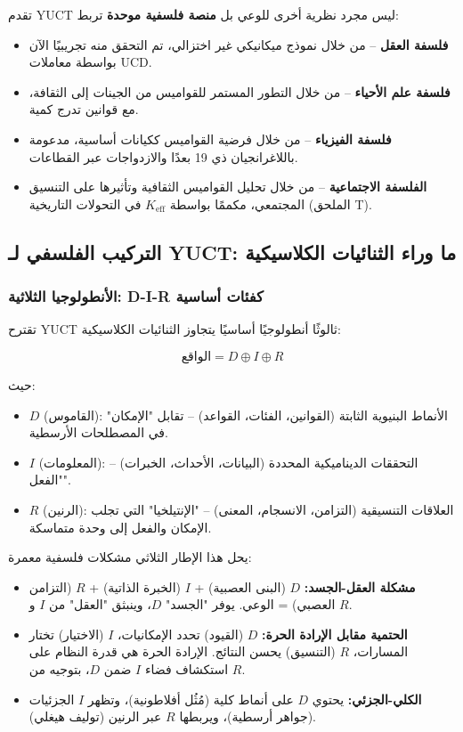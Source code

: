 \documentclass[12pt,a4paper]{article}
\newcommand{\eff}{\mathrm{eff}}
\newcommand{\Ke}{K_{\eff}}
\begin{document}
	تقدم YUCT ليس مجرد نظرية أخرى للوعي بل \textbf{منصة فلسفية موحدة} تربط:
	\begin{itemize}
		\item \textbf{فلسفة العقل} – من خلال نموذج ميكانيكي غير اختزالي، تم التحقق منه تجريبيًا الآن بواسطة معاملات UCD.
		\item \textbf{فلسفة علم الأحياء} – من خلال التطور المستمر للقواميس من الجينات إلى الثقافة، مع قوانين تدرج كمية.
		\item \textbf{فلسفة الفيزياء} – من خلال فرضية القواميس ككيانات أساسية، مدعومة باللاغرانجيان ذي 19 بعدًا والازدواجات عبر القطاعات.
		\item \textbf{الفلسفة الاجتماعية} – من خلال تحليل القواميس الثقافية وتأثيرها على التنسيق المجتمعي، مكممًا بواسطة \(\Ke\) في التحولات التاريخية (الملحق T).
	\end{itemize}
	
	\subsection{التركيب الفلسفي لـ YUCT: ما وراء الثنائيات الكلاسيكية}
	
	\subsubsection{الأنطولوجيا الثلاثية: D-I-R كفئات أساسية}
	
	تقترح YUCT ثالوثًا أنطولوجيًا أساسيًا يتجاوز الثنائيات الكلاسيكية:
	
	\[
	\text{الواقع} = D \oplus I \oplus R
	\]
	
	حيث:
	\begin{itemize}
		\item $D$ (القاموس): الأنماط البنيوية الثابتة (القوانين، الفئات، القواعد) – تقابل "الإمكان" في المصطلحات الأرسطية.
		\item $I$ (المعلومات): التحققات الديناميكية المحددة (البيانات، الأحداث، الخبرات) – "الفعل".
		\item $R$ (الرنين): العلاقات التنسيقية (التزامن، الانسجام، المعنى) – "الإنتيلخيا" التي تجلب الإمكان والفعل إلى وحدة متماسكة.
	\end{itemize}
	
	يحل هذا الإطار الثلاثي مشكلات فلسفية معمرة:
	
	\begin{itemize}
		\item \textbf{مشكلة العقل-الجسد:} $D$ (البنى العصبية) + $I$ (الخبرة الذاتية) + $R$ (التزامن العصبي) = الوعي. يوفر "الجسد" $D$، وينبثق "العقل" من $I$ و $R$.
		\item \textbf{الحتمية مقابل الإرادة الحرة:} $D$ (القيود) تحدد الإمكانيات، $I$ (الاختيار) تختار المسارات، $R$ (التنسيق) يحسن النتائج. الإرادة الحرة هي قدرة النظام على استكشاف فضاء $I$ ضمن $D$، بتوجيه من $R$.
		\item \textbf{الكلي-الجزئي:} يحتوي $D$ على أنماط كلية (مُثُل أفلاطونية)، وتظهر $I$ الجزئيات (جواهر أرسطية)، ويربطها $R$ عبر الرنين (توليف هيغلي).
	\end{itemize}
	
\end{document}
